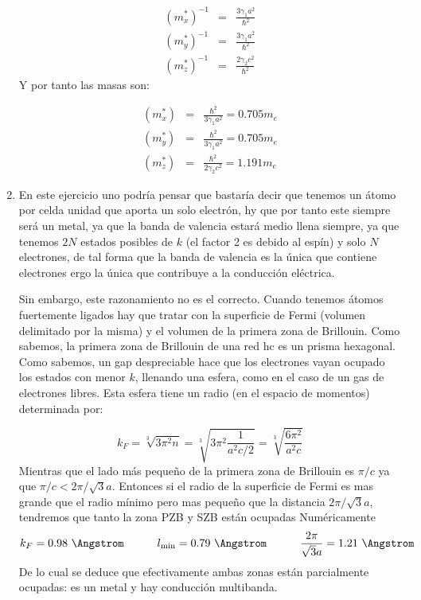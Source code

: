\begin{solucion}
\begin{enumerate}[label=\alph*)]
		 \begin{eqnarray*}
		 	(m_{x}^*)^{-1} & = &  \frac{3\gamma_1 a^2}{\hbar^2}	 	\\
		 	(m_{y}^*)^{-1} & =  & \frac{3\gamma_1 a^2}{\hbar^2}   \\
		 	(m_{z}^*)^{-1} & = & \frac{2 \gamma_2 c^2}{\hbar^2}
		 \end{eqnarray*}	
		 Y por tanto las masas son: 
		 
		 \begin{eqnarray*}
		 	(m_{x}^*) & = & \frac{\hbar^2}{3\gamma_1 a^2}= 0.705 m_e	 	\\
		 	(m_{y}^*) & = & \frac{\hbar^2}{3\gamma_1 a^2}=0.705 m_e	  \\
		 	(m_{z}^*) & = & \frac{\hbar^2}{2 \gamma_2 c^2} = 1.191 m_e	 
		 \end{eqnarray*}	
		 \item En este ejercicio uno podría pensar que bastaría decir que tenemos un átomo por celda unidad que aporta un solo electrón, hy que por tanto este siempre será un metal, ya que la banda de valencia estará medio llena siempre, ya que tenemos $2N$ estados posibles de $k$ (el factor 2 es debido al espín) y solo $N$ electrones, de tal forma que la banda de valencia es la única que contiene electrones ergo la única que contribuye a la conducción eléctrica. 
		 
		 Sin embargo, este razonamiento no es el correcto. Cuando tenemos átomos fuertemente ligados hay que tratar con la superficie de Fermi (volumen delimitado por la misma) y el volumen de la primera zona de Brillouin. Como sabemos, la primera zona de Brillouin de una red hc es un prisma hexagonal. Como sabemos, un gap despreciable hace que los electrones vayan ocupado los estados con menor $k$, llenando una esfera, como en el caso de un gas de electrones libres. Esta esfera tiene un radio (en el espacio de momentos) determinada por:
		 
		 \begin{equation*}
		 	k_F = \sqrt[3]{3\pi^2 n} = \sqrt[3]{3 \pi^2 \frac{1}{a^2c/2} } = \sqrt[3]{\frac{6\pi^2}{a^2 c}}
		 \end{equation*}
		 Mientras que el lado más pequeño de la primera zona de Brillouin es $\pi/c$ ya que $\pi/c < 2\pi / \sqrt{3}a$. Entonces si el radio de la superficie de Fermi es mas grande que el radio mínimo pero mas pequeño que la distancia $2\pi/\sqrt{3}a$, tendremos que tanto la zona PZB y SZB están ocupadas Numéricamente
		 \begin{equation*}
		 	k_F = 0.98 \ \unit{\Angstrom} \tquad l_{\min} = 0.79 \ \unit{\Angstrom} \tquad \frac{2\pi}{\sqrt{3}a} = 1.21 \ \unit{\Angstrom}
		 \end{equation*}
		 De lo cual se deduce que efectivamente ambas zonas están parcialmente ocupadas: es un metal y hay conducción multibanda.
		 
	\end{enumerate}
\end{solucion}


